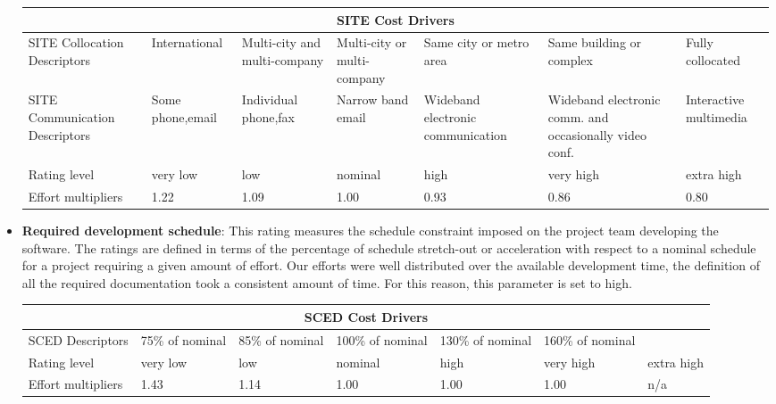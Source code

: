 \begin{itemize}
\begin{longtable}{| m{}| m{} | m{} | m{} | m{} | m{} | m{}| }
\hline
\multicolumn{7}{c}{SITE Cost Drivers}\\
\hline
\hline
SITE Collocation Descriptors & International & Multi-city and multi-company & Multi-city or multi-company & Same city or metro area & Same building or complex  & Fully collocated \\
\hline
SITE Communication Descriptors & Some phone,email & Individual phone,fax & Narrow band email & Wideband electronic communication &  Wideband electronic comm. and occasionally video conf. & Interactive multimedia  \\ 
Rating level & very low & low & nominal & high & very high & extra high \\
\hline
Effort multipliers & 1.22 & 1.09 & 1.00 & 0.93 & 0.86 & 0.80 \\
\hline
\end{longtable}

\item \textbf{Required development schedule}: This rating measures the schedule constraint imposed on the project team developing the software. The ratings are defined in terms of the percentage of schedule stretch-out or acceleration with respect to a nominal schedule for a project requiring a given amount of effort. Our efforts were well distributed over the available development time, the definition of all the required documentation took a consistent amount of time. For this reason, this parameter
is set to high.

\begin{longtable}{| m{}| m{} | m{} | m{} | m{} | m{} | m{}| }
\hline
\multicolumn{7}{c}{SCED Cost Drivers}\\
\hline
\hline
SCED Descriptors & 75\% of nominal & 85\% of nominal & 100\% of nominal & 130\% of nominal & 160\% of nominal  &  \\
\hline
Rating level & very low & low & nominal & high & very high & extra high \\
\hline
Effort multipliers & 1.43 & 1.14 & 1.00 & 1.00 & 1.00 & n/a \\
\hline
\end{longtable}

\end{itemize}

